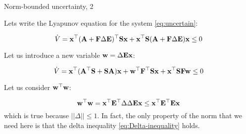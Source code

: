\documentclass{beamer}
\begin{document}
	\begin{frame}{Norm-bounded uncertainty, 2}
		\begin{flushleft}
			
			Lets write the Lyapunov equation for the system \eqref{eq:uncertain}:
			
			\begin{equation}
				\dot V = \mathbf{x}^\top 
				(\mathbf{A} + \mathbf{F} \Delta \mathbf{E})^\top\mathbf{S}\mathbf{x} + \mathbf{x}^\top\mathbf{S} (\mathbf{A} + \mathbf{F} \Delta \mathbf{E}) \mathbf{x} \leq 0
			\end{equation}
			
			Let us introduce a new variable $\mathbf{w} = \Delta \mathbf{E}\mathbf{x}$:
			
			\begin{equation}
				\label{eq:Lyapunov_xw}
				\dot V = \mathbf{x}^\top 
				(\mathbf{A}^\top \mathbf{S} + \mathbf{S}\mathbf{A}) \mathbf{x} + 
				\mathbf{w}^\top \mathbf{F}^\top\mathbf{S} \mathbf{x} +
				\mathbf{x}^\top \mathbf{S}\mathbf{F} \mathbf{w} \leq 0
			\end{equation}
			
			Let us consider $\mathbf{w}^\top \mathbf{w}$:
			
			\begin{equation}
				\label{eq:Delta-inequality}
				\mathbf{w}^\top \mathbf{w} = 
				\mathbf{x}^\top\mathbf{E}^\top \Delta \Delta \mathbf{E}\mathbf{x}
				\leq
				\mathbf{x}^\top\mathbf{E}^\top \mathbf{E}\mathbf{x}
			\end{equation}		
			which is true because $|| \Delta ||\leq 1$. In fact, the only property of the norm that we need here is that the delta inequality \eqref{eq:Delta-inequality} holds.
			
		\end{flushleft}
	\end{frame}
	
	
	
\end{document}
